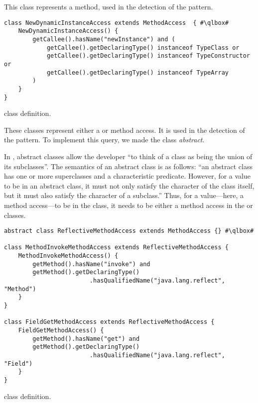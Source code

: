 This class represents a  method,
used in the detection of the  pattern.

\begin{listing}
\begin{verbatim}
class NewDynamicInstanceAccess extends MethodAccess  { #\qlbox#
	NewDynamicInstanceAccess() {
		getCallee().hasName("newInstance") and (
			getCallee().getDeclaringType() instanceof TypeClass or
			getCallee().getDeclaringType() instanceof TypeConstructor or
			getCallee().getDeclaringType() instanceof TypeArray
		)
	}
}
\end{verbatim}
\caption{ class definition.}
\label{lst:ql:NewDynamicInstanceAccess}
\end{listing}


These classes represent either a  or  method access.
It is used in the detection of the  pattern.
To implement this query, we made the  class 
\emph{abstract}.

In \ql{}, abstract classes allow the developer 
``to think of a class as being the union of its subclasses''.%
The semantics of an abstract class is as follows:
``an abstract class has one or more superclasses and a characteristic predicate.
However, for a value to be in an abstract class,
it must not only satisfy the character of the class itself,
but it must also satisfy the character of a subclass.''
Thus,
for a value---here, a method access---to be in the  class,
it needs to be either a method access in the  or  classes.

\begin{listing}
\begin{verbatim}
abstract class ReflectiveMethodAccess extends MethodAccess {} #\qlbox#

class MethodInvokeMethodAccess extends ReflectiveMethodAccess {
	MethodInvokeMethodAccess() {
		getMethod().hasName("invoke") and
		getMethod().getDeclaringType()
						.hasQualifiedName("java.lang.reflect", "Method")
	}
}

class FieldGetMethodAccess extends ReflectiveMethodAccess {
	FieldGetMethodAccess() {
		getMethod().hasName("get") and
		getMethod().getDeclaringType()
						.hasQualifiedName("java.lang.reflect", "Field")
	}
}
\end{verbatim}
\caption{ class definition.}
\label{lst:ql:ReflectiveMethodAccess}
\end{listing}

